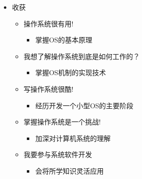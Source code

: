 \begin{frame}
\begin{columns}[t]
    \begin{column}{0.5\textwidth}
        \begin{itemize}
            \item 收获
        \begin{itemize}
            \item 操作系统很有用!
                \begin{itemize}
                    \item 掌握OS的基本原理
                \end{itemize}
            \item 我想了解操作系统到底是如何工作的？
                \begin{itemize}
                    \item 掌握OS机制的实现技术
                \end{itemize}
            \item 写操作系统很酷!
                \begin{itemize}
                    \item 经历开发一个小型OS的主要阶段
                \end{itemize}
            \item 掌握操作系统是一个挑战!
                \begin{itemize}
                    \item 加深对计算机系统的理解
                \end{itemize}
            \item 我要参与系统软件开发
                \begin{itemize}
                    \item 会将所学知识灵活应用
                \end{itemize}
            \end{itemize}
        \end{itemize}
        \end{column}
    \end{columns}
    
    \end{frame}

    
